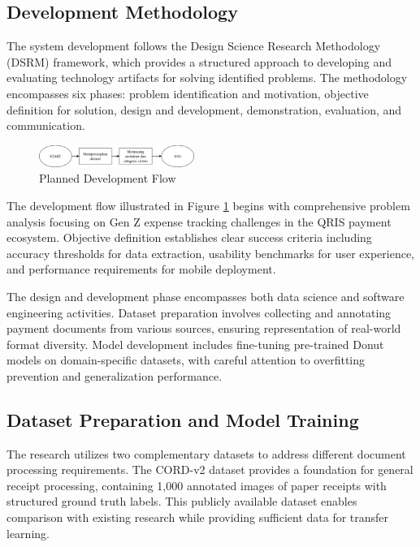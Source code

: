\subsection{Development Methodology}
The system development follows the Design Science Research Methodology (DSRM) framework, which provides a structured approach to developing and evaluating technology artifacts for solving identified problems. The methodology encompasses six phases: problem identification and motivation, objective definition for solution, design and development, demonstration, evaluation, and communication.

\begin{figure}[htbp]
    \centerline{\includegraphics[width=0.45\textwidth]{images/design-flow.png}}
    \caption{Planned Development Flow}
    \label{fig:devflow}
\end{figure}

The development flow illustrated in Figure \ref{fig:devflow} begins with comprehensive problem analysis focusing on Gen Z expense tracking challenges in the QRIS payment ecosystem. Objective definition establishes clear success criteria including accuracy thresholds for data extraction, usability benchmarks for user experience, and performance requirements for mobile deployment.

The design and development phase encompasses both data science and software engineering activities. Dataset preparation involves collecting and annotating payment documents from various sources, ensuring representation of real-world format diversity. Model development includes fine-tuning pre-trained Donut models on domain-specific datasets, with careful attention to overfitting prevention and generalization performance.

\subsection{Dataset Preparation and Model Training}
The research utilizes two complementary datasets to address different document processing requirements. The CORD-v2 dataset provides a foundation for general receipt processing, containing 1,000 annotated images of paper receipts with structured ground truth labels. This publicly available dataset enables comparison with existing research while providing sufficient data for transfer learning.

